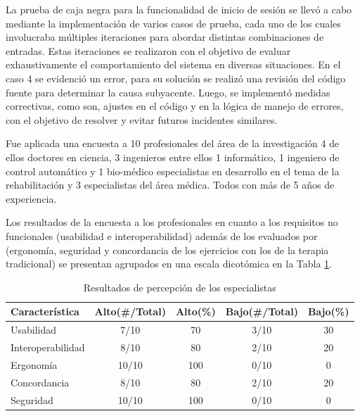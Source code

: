 La prueba de caja negra para la funcionalidad de inicio de sesión se llevó a cabo mediante la implementación de varios casos de prueba, cada uno de los cuales involucraba múltiples iteraciones para abordar distintas combinaciones de entradas. Estas iteraciones se realizaron con el objetivo de evaluar exhaustivamente el comportamiento del sistema en diversas situaciones. En el caso 4 se evidenció un error, para su solución se realizó una revisión del código fuente para determinar la causa subyacente. Luego, se implementó medidas correctivas, como son, ajustes en el código y en la lógica de manejo de errores, con el objetivo de resolver y evitar futuros incidentes similares.

Fue aplicada una encuesta a 10 profesionales del área de la investigación 4 de ellos doctores en ciencia, 3 ingenieros entre ellos 1 informático, 1 ingeniero de control automático y 1 bio-médico especialistas en desarrollo en el tema de la rehabilitación y 3 especialistas del área médica. Todos con más de 5 años de experiencia.

\vspace{5pt}
Los resultados de la encuesta a los profesionales en cuanto a los requisitos no funcionales (usabilidad e interoperabilidad) además de los evaluados por \cite{franco2016sistema} (ergonomía, seguridad y concordancia de los ejercicios con los de la terapia tradicional) se presentan agrupados en una escala dicotómica en la Tabla \ref{table:test}.

\begin{table}[ht]
    \centering
    \begin{tabular}{p{3cm} c c c c}
        \hline
        Característica      &  Alto(\#/Total)   &  Alto(\%) & Bajo(\#/Total)  & Bajo(\%) \\\hline
        Usabilidad          &  7/10   &  70   & 3/10  &   30\\
        Interoperabilidad   &  8/10   &  80   & 2/10  &   20\\
        Ergonomía           &  10/10  &  100  & 0/10  &   0\\
        Concordancia        &  8/10   &  80   & 2/10  &   20\\
        Seguridad           &  10/10  &  100  & 0/10  &   0\\
        \hline        
    \end{tabular}        
    \caption{Resultados de percepción de los especialistas}
    \label{table:test}
\end{table}

